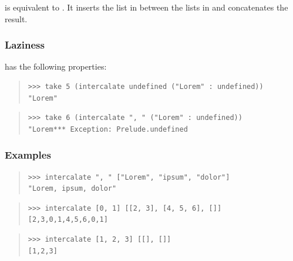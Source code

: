 \begin{haddockdesc}
\item[\begin{tabular}{@{}l}
intercalate :: {\char 91}a{\char 93} -> {\char 91}{\char 91}a{\char 93}{\char 93} -> {\char 91}a{\char 93}
\end{tabular}]
{\haddockbegindoc
{}  is equivalent to .
 It inserts the list  in between the lists in  and concatenates the
 result.\par
\subsubsection*{\textbf{Laziness}}
 has the following properties:\par
\begin{quote}
{\haddockverb\begin{verbatim}
>>> take 5 (intercalate undefined ("Lorem" : undefined))
"Lorem"

\end{verbatim}}
\end{quote}
\begin{quote}
{\haddockverb\begin{verbatim}
>>> take 6 (intercalate ", " ("Lorem" : undefined))
"Lorem*** Exception: Prelude.undefined

\end{verbatim}}
\end{quote}
\subsubsection*{\textbf{Examples}}
\begin{quote}
{\haddockverb\begin{verbatim}
>>> intercalate ", " ["Lorem", "ipsum", "dolor"]
"Lorem, ipsum, dolor"

\end{verbatim}}
\end{quote}
\begin{quote}
{\haddockverb\begin{verbatim}
>>> intercalate [0, 1] [[2, 3], [4, 5, 6], []]
[2,3,0,1,4,5,6,0,1]

\end{verbatim}}
\end{quote}
\begin{quote}
{\haddockverb\begin{verbatim}
>>> intercalate [1, 2, 3] [[], []]
[1,2,3]

\end{verbatim}}
\end{quote}}
\end{haddockdesc}
